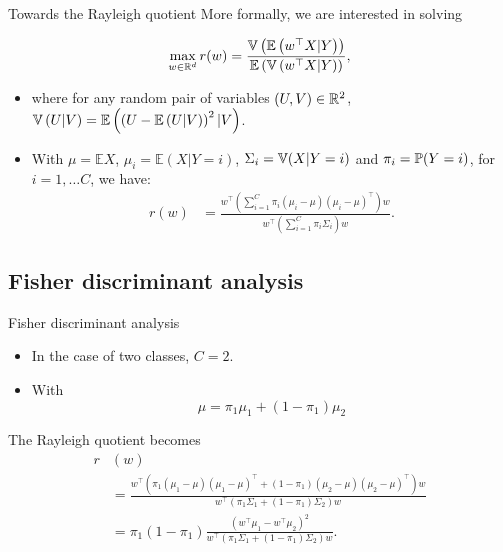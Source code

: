 \documentclass[xcolor={usenames,dvipsnames},handout]{beamer}
\begin{document}
\begin{frame}{Towards the Rayleigh quotient}
	More formally, we are interested in solving
	\begin{block}{}
	$$
		\max_{w\in\R^d}  r(w) = \frac{\V \left( \mathbb{E} \left( w^\top X|Y \right)\right)}{\mathbb{E} \left( \V \left( w ^\top X | Y \right) \right)},
	$$
	\end{block}
	\begin{itemize}
	\item where for any random pair of variables $(U, V) \in \R^2$,
	$\V \left( U | V \right) = \mathbb{E} \left( \left( U - \mathbb{E} \left( U | V \right) \right)^2 | V \right)$.
	\pause
	\item With $\mu = \mathbb{E} X$, $\mu_i = \mathbb{E} (X|Y=i)$, $\Sigma_i = \V(X|Y=i)$ and $\pi_i =\P (Y=i)$,  for $i=1,\hdots C$, we have:
	\begin{align*}
		r(w)
		&= \frac{w^\top \left( \sum_{i=1}^C \pi_i (\mu_i - \mu) (\mu_i - \mu)^\top \right) w}{w ^\top  \left( \sum_{i=1}^C \pi_i \Sigma_i \right) w}.
	\end{align*}
	\end{itemize}
\end{frame}

\subsection{Fisher discriminant analysis}

\begin{frame}{Fisher discriminant analysis}

	\begin{itemize}
	\item In the case of two classes, $C=2$.
	\item With
	$$
	\mu = \pi_1 \mu_1 + (1-\pi_1)\mu_2
	$$
	\end{itemize}
	
	\begin{block}{The Rayleigh quotient becomes}
	\begin{align*}
		r&(w)\\
		&= \frac{w^\top \left( \pi_1 (\mu_1 - \mu) (\mu_1 - \mu)^\top + (1-\pi_1) (\mu_2 - \mu) (\mu_2 - \mu)^\top \right) w}{w ^\top  \left( \pi_1 \Sigma_1 + (1-\pi_1) \Sigma_2 \right) w} \\
		&= \pi_1(1-\pi_1) \frac{(w^\top\mu_1 - w^\top\mu_2)^2}{w ^\top  \left( \pi_1 \Sigma_1 + (1-\pi_1) \Sigma_2 \right) w}.
	\end{align*}
	\end{block}
	
\end{frame}
\end{document}
